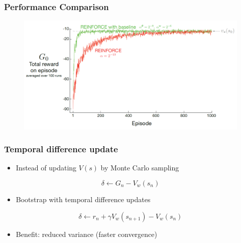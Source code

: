 \documentclass[11pt,table]{beamer}
\begin{document}
\begin{frame}
\frametitle{Performance Comparison}

\begin{figure}
	\centering
		\includegraphics[width=1.00\textwidth]{figures/1}
	\label{fig:1}
\end{figure}


\end{frame}

\begin{frame}
\frametitle{Temporal difference update}

\begin{itemize}
    \item Instead of updating \( V(s) \) by Monte Carlo sampling
\end{itemize}

\[
\delta \leftarrow G_n - V_w(s_n)
\]

\begin{itemize}
    \item Bootstrap with temporal difference updates
\end{itemize}

\[
\delta \leftarrow r_n + \gamma V_w(s_{n+1}) - V_w(s_n)
\]

\begin{itemize}
    \item Benefit: reduced variance (faster convergence)
\end{itemize}

\end{frame}
\end{document}
